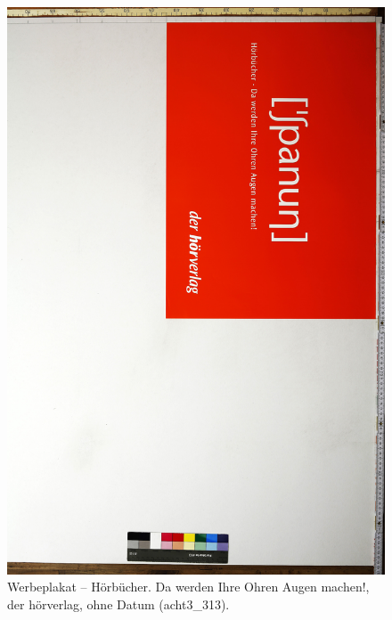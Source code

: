 \documentclass[a4paper,12pt,ngerman]{article}
\begin{document}
\newpage
\begin{landscape}
\begin{figure}[ht]
\includegraphics[height=0.85\linewidth, angle=90]{Abbildung_26_(acht3_313)}
\centering
\caption{Werbeplakat – Hörbücher. Da werden Ihre Ohren Augen machen!, der hörverlag, ohne Datum (acht3\_313).}
\end{figure}
\end{landscape}
\end{document}
